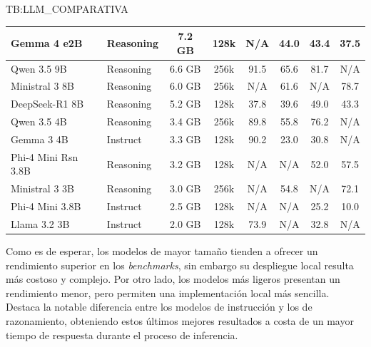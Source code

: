 \begin{table}[Comparativa técnica de LLMs en Ollama (Auditoría Final)]{TB:LLM_COMPARATIVA}
\begin{tabular}{|l|l|c|c|c|c|c|c|}
    Gemma 4 e2B           & Reasoning & 7.2 GB  & 128k & N/A     & 44.0 & 43.4 & 37.5 \\ \hline
    \rowcolor{ulepsbased} Qwen 3.5 9B           & Reasoning & 6.6 GB  & 256k & 91.5    & 65.6 & 81.7 & N/A  \\ \hline
    Ministral 3 8B        & Reasoning & 6.0 GB  & 256k & N/A     & 61.6 & N/A  & 78.7 \\ \hline
    \rowcolor{ulepsbased} DeepSeek-R1 8B        & Reasoning & 5.2 GB  & 128k & 37.8    & 39.6 & 49.0 & 43.3 \\ \hline
    Qwen 3.5 4B           & Reasoning & 3.4 GB  & 256k & 89.8    & 55.8 & 76.2 & N/A  \\ \hline
    \rowcolor{ulepsbased} Gemma 3 4B            & Instruct  & 3.3 GB  & 128k & 90.2    & 23.0 & 30.8 & N/A  \\ \hline
    Phi-4 Mini Rsn 3.8B   & Reasoning & 3.2 GB  & 128k & N/A     & N/A  & 52.0 & 57.5 \\ \hline
    \rowcolor{ulepsbased} Ministral 3 3B        & Reasoning & 3.0 GB  & 256k & N/A     & 54.8 & N/A  & 72.1 \\ \hline
    Phi-4 Mini 3.8B       & Instruct  & 2.5 GB  & 128k & N/A     & N/A  & 25.2 & 10.0 \\ \hline
    \rowcolor{ulepsbased} Llama 3.2 3B          & Instruct  & 2.0 GB  & 128k & 73.9    & N/A  & 32.8 & N/A  \\ \hline
  \end{tabular}
  \endgroup
\end{table}

Como es de esperar, los modelos de mayor tamaño tienden a ofrecer un rendimiento superior en los \textit{benchmarks}, sin embargo su despliegue local resulta más costoso y complejo. Por otro lado, los modelos más ligeros presentan un rendimiento menor, pero permiten una implementación local más sencilla. Destaca la notable diferencia entre los modelos de instrucción y los de razonamiento, obteniendo estos últimos mejores resultados a costa de un mayor tiempo de respuesta durante el proceso de inferencia. 

